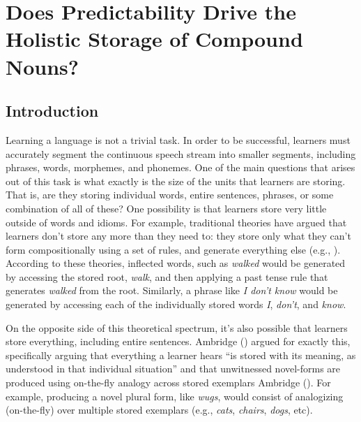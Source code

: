 \documentclass[
  12pt,
  letterpaper,
]{scrreport}
\begin{document}

\chapter{Does Predictability Drive the Holistic Storage of Compound
Nouns?}\label{does-predictability-drive-the-holistic-storage-of-compound-nouns}

\section{Introduction}\label{introduction-1}

Learning a language is not a trivial task. In order to be successful,
learners must accurately segment the continuous speech stream into
smaller segments, including phrases, words, morphemes, and phonemes. One
of the main questions that arises out of this task is what exactly is
the size of the units that learners are storing. That is, are they
storing individual words, entire sentences, phrases, or some combination
of all of these? One possibility is that learners store very little
outside of words and idioms. For example, traditional theories have
argued that learners don't store any more than they need to: they store
only what they can't form compositionally using a set of rules, and
generate everything else (e.g., ). According to these theories, inflected words, such as
\emph{walked} would be generated by accessing the stored root,
\emph{walk}, and then applying a past tense rule that generates
\emph{walked} from the root. Similarly, a phrase like \emph{I don't
know} would be generated by accessing each of the individually stored
words \emph{I}, \emph{don't}, and \emph{know}.

On the opposite side of this theoretical spectrum, it's also possible
that learners store everything, including entire sentences. Ambridge
() argued for
exactly this, specifically arguing that everything a learner hears ``is
stored with its meaning, as understood in that individual situation''
and that unwitnessed novel-forms are produced using on-the-fly analogy
across stored exemplars Ambridge
(). For
example, producing a novel plural form, like \emph{wugs}, would consist
of analogizing (on-the-fly) over multiple stored exemplars (e.g.,
\emph{cats}, \emph{chairs}, \emph{dogs}, etc).
\end{document}
